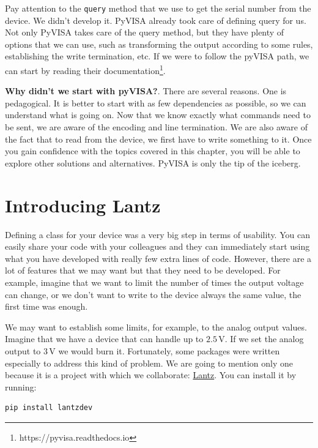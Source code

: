 Pay attention to the \texttt{query} method that we use to get the serial number from the device. We didn't develop it. PyVISA already took care of defining query for us. Not only PyVISA takes care of the query method, but they have plenty of options that we can use, such as transforming the output according to some rules, establishing the write termination, etc. If we were to follow the pyVISA path, we can start by reading their documentation\footnote{https://pyvisa.readthedocs.io}.

\textbf{Why didn't we start with pyVISA?}. There are several reasons. One is pedagogical. It is better to start with as few dependencies as possible, so we can understand what is going on. Now that we know exactly what commands need to be sent, we are aware of the encoding and line termination. We are also aware of the fact that to read from the device, we first have to write something to it. Once you gain confidence with the topics covered in this chapter, you will be able to explore other solutions and alternatives. PyVISA is only the tip of the iceberg.

\section{Introducing Lantz}\label{section:lantz}
Defining a class for your device was a very big step in terms of usability. You can easily share your code with your colleagues and they can immediately start using what you have developed with really few extra lines of code. However, there are a lot of features that we may want but that they need to be developed. For example, imagine that we want to limit the number of times the output voltage can change, or we don't want to write to the device always the same value, the first time was enough.

We may want to establish some limits, for example, to the analog output values. Imagine that we have a device that can handle up to $2.5\,\textrm{V}$. If we set the analog output to $3\,\textrm{V}$ we would burn it. Fortunately, some packages were written especially to address this kind of problem. We are going to mention only one because it is a project with which we collaborate: \href{https://github.com/lantzproject/lantz}{Lantz}. You can install it by running:

\begin{verbatim}
pip install lantzdev
\end{verbatim}


